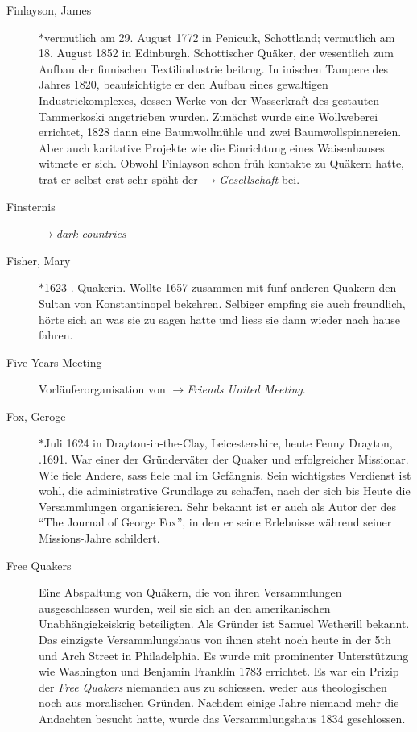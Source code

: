 \begin{description}
 \item[Finlayson, James] $\ast$vermutlich am 29. August 1772 in Penicuik,
 Schottland; \dag vermutlich am 18. August 1852 in Edinburgh. Schottischer
 Quäker, der wesentlich zum Aufbau der finnischen Textilindustrie beitrug. In
 inischen Tampere des Jahres 1820, beaufsichtigte er den Aufbau eines
 gewaltigen Industriekomplexes, dessen Werke von der Wasserkraft des gestauten
 Tammerkoski angetrieben wurden. Zunächst wurde eine Wollweberei errichtet,
 1828 dann eine Baumwollmühle und zwei Baumwollspinnereien. Aber auch
 karitative Projekte wie die Einrichtung eines Waisenhauses witmete er sich.
 Obwohl Finlayson schon früh kontakte zu Quäkern hatte, trat er selbst erst
 sehr späht der $\to$\textit{Gesellschaft} bei.

\item[Finsternis] $\to$\textit{dark countries}

 \item[Fisher, Mary] $\ast$1623 . Quakerin. Wollte 1657 zusammen mit
 fünf anderen Quakern den Sultan von Konstantinopel bekehren. Selbiger empfing
 sie auch freundlich, hörte sich an was sie zu sagen hatte und liess sie dann
 wieder nach hause fahren.

 \item[Five Years Meeting] Vorläuferorganisation von $\to$\textit{Friends
 United Meeting}.

 \item[Fox, Geroge] $\ast$Juli 1624 in Drayton-in-the-Clay, Leicestershire,
 heute Fenny Drayton, .1691. War einer der Gründerväter der Quaker und
 erfolgreicher Missionar. Wie fiele Andere, sass fiele mal im Gefängnis. Sein
 wichtigstes Verdienst ist wohl, die administrative Grundlage zu schaffen, nach
 der sich bis Heute die Versammlungen organisieren. Sehr bekannt ist er auch
 als Autor der des "`The Journal of George Fox"', in den er seine Erlebnisse
 während seiner Missions-Jahre schildert.

 \item[Free Quakers] Eine Abspaltung von Quäkern, die von ihren Versammlungen
 ausgeschlossen wurden, weil sie sich an den amerikanischen Unabhängigkeiskrig
 beteiligten. Als Gründer ist Samuel Wetherill bekannt. Das einzigste
 Versammlungshaus von ihnen steht noch heute in der 5th und Arch Street in
 Philadelphia. Es wurde mit prominenter Unterstützung wie Washington und
 Benjamin Franklin 1783 errichtet. Es war ein Prizip der \textit{Free Quakers}
 niemanden aus zu schiessen. weder aus theologischen noch aus moralischen
 Gründen. Nachdem einige Jahre niemand mehr die Andachten besucht hatte, wurde
 das Versammlungshaus 1834 geschlossen.


\end{description}
